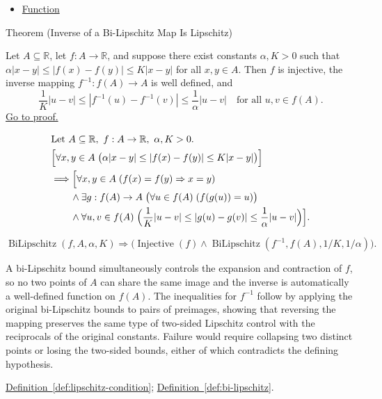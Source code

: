 \begin{dependencies}
\begin{itemize}
  \item \hyperref[def:function]{Function}
\end{itemize}
\end{dependencies}

\begin{theorembox}{Theorem (Inverse of a Bi-Lipschitz Map Is Lipschitz)}
\begin{theorem}
\label{thm:bilipschitz-inverse-is-lipschitz}
Let $A \subseteq \mathbb{R}$, let $f:A \to \mathbb{R}$, and suppose there exist constants $\alpha,K>0$ such that
$\alpha |x-y| \le |f(x)-f(y)| \le K |x-y|$ for all $x,y \in A$. Then $f$ is injective, the inverse mapping $f^{-1}:f(A) \to A$ is well defined, and
\[
\frac{1}{K}|u-v| \le |f^{-1}(u)-f^{-1}(v)| \le \frac{1}{\alpha}|u-v|
\quad\text{for all } u,v \in f(A).
\]
\hyperref[prf:bilipschitz-inverse-is-lipschitz]{Go to proof.}
\end{theorem}
\end{theorembox}

\begin{remark*}
\[
\begin{aligned}
&\text{Let } A \subseteq \mathbb{R},\ f:A \to \mathbb{R},\ \alpha,K>0.\\
&\Bigl[\forall x,y \in A\;\bigl(\alpha |x-y| \le |f(x)-f(y)| \le K|x-y|\bigr)\Bigr]\\
&\Longrightarrow
\Bigl[\forall x,y \in A\;(f(x)=f(y) \Rightarrow x=y) \\
&\qquad\land \exists g:f(A)\to A\;\bigl(\forall u \in f(A)\;(f(g(u))=u)\bigr) \\
&\qquad\land \forall u,v \in f(A)\;\Bigl(\frac{1}{K}|u-v| \le |g(u)-g(v)| \le \frac{1}{\alpha}|u-v|\Bigr)\Bigr].
\end{aligned}
\]
\end{remark*}

\begin{remark*}
\[
\operatorname{BiLipschitz}(f,A,\alpha,K)
\Rightarrow
\bigl(\operatorname{Injective}(f) \land \operatorname{BiLipschitz}(f^{-1},f(A),1/K,1/\alpha)\bigr).
\]
\end{remark*}

\begin{remark*}[Interpretation]
A bi-Lipschitz bound simultaneously controls the expansion and contraction of $f$, so no two points of $A$ can share the same image and the inverse is automatically a well-defined function on $f(A)$. The inequalities for $f^{-1}$ follow by applying the original bi-Lipschitz bounds to pairs of preimages, showing that reversing the mapping preserves the same type of two-sided Lipschitz control with the reciprocals of the original constants. Failure would require collapsing two distinct points or losing the two-sided bounds, either of which contradicts the defining hypothesis.
\end{remark*}

\begin{dependencies}
\hyperref[def:lipschitz-condition]{Definition~\ref*{def:lipschitz-condition}}; \hyperref[def:bi-lipschitz]{Definition~\ref*{def:bi-lipschitz}}.
\end{dependencies}

